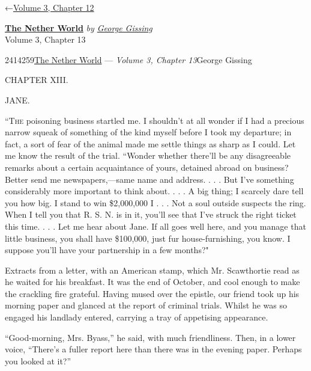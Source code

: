 \hypertarget{headerContainer}{}
\hypertarget{navigationHeader}{}
\protect\hypertarget{headerprevious}{}{←\href{/wiki/The_Nether_World/Volume_3/Chapter_12}{Volume
3, Chapter 12}}

\textbf{\protect\hypertarget{header_title_text}{}{\href{/wiki/The_Nether_World}{The
Nether World}}} \emph{by
\href{/wiki/Author:George_Gissing}{\protect\hypertarget{header_author_text}{}{{George
Gissing}}}}\\
\protect\hypertarget{header_section_text}{}{Volume 3, Chapter 13}

\hypertarget{navigationNotes}{}

\hypertarget{ws-data}{}
\protect\hypertarget{ws-article-id}{}{2414259}\protect\hypertarget{ws-title}{}{\href{/wiki/The_Nether_World}{The
Nether World} --- \emph{Volume 3, Chapter
13}}\protect\hypertarget{ws-author}{}{George Gissing}

{\protect\hypertarget{285}{}{}}

{CHAPTER XIII.}

{JANE.}

\textsc{``The} poisoning business startled me. I shouldn't at all wonder
if I had a precious narrow squeak of something of the kind myself before
I took my departure; in fact, a sort of fear of the animal made me
settle things as sharp as I could. Let me know the result of the trial.
``Wonder whether there'll be any disagreeable remarks about a certain
acquaintance of yours, detained abroad on business? Better send me
newspapers,---same name and address. . . . But I've something
considerably more important to think about. . . . A big thing; I
scarcely dare tell you how big. I stand to win \$2,000,000 I . . . Not a
soul outside suspects the ring. When I tell you that R. S. N. is in it,
you'll see that I've struck the right ticket this time. . . . Let me
hear about Jane. If all goes well here, and you manage that little
business, you shall have \$100,000, just fur
{\protect\hypertarget{286}{}{}} house-furnishing, you know. I suppose
you'll have your partnership in a few months?"

Extracts from a letter, with an American stamp, which Mr. Scawthortie
read as he waited for his breakfast. It was the end of October, and cool
enough to make the crackling fire grateful. Having mused over the
epistle, our friend took up his morning paper and glanced at the report
of criminal trials. Whilst he was so engaged his landlady entered,
carrying a tray of appetising appearance.

``Good-morning, Mrs. Byass,'' he said, with much friendliness. Then, in
a lower voice, ``There's a fuller report here than there was in the
evening paper. Perhaps you looked at it?''

